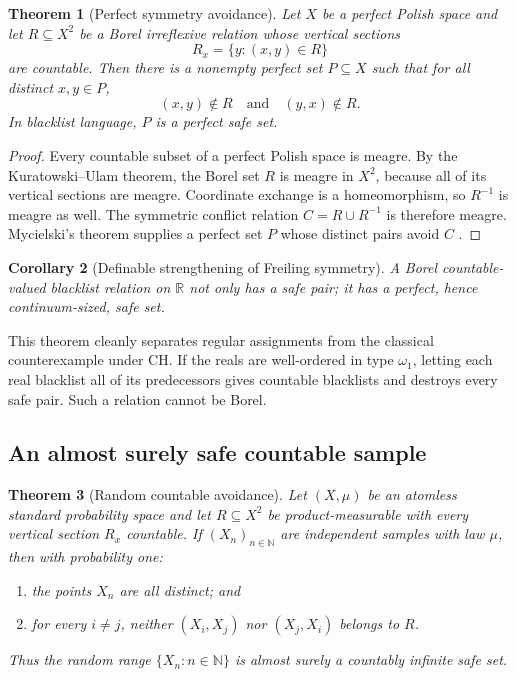 \documentclass[11pt]{article}
\newtheorem{theorem}{Theorem}[section]
\newtheorem{corollary}[theorem]{Corollary}
\theoremstyle{definition}
\theoremstyle{remark}
\newcommand{\N}{\mathbb N}
\newcommand{\R}{\mathbb R}
\begin{document}
\begin{theorem}[Perfect symmetry avoidance]\label{fbl:thm:perfect}
Let $X$ be a perfect Polish space and let $R\subseteq X^2$ be a Borel
irreflexive relation whose vertical sections
\[
       R_x=\{y:(x,y)\in R\}
\]
are countable.  Then there is a nonempty perfect set $P\subseteq X$ such
that for all distinct $x,y\in P$,
\[
        (x,y)\notin R
        \quad\text{and}\quad
        (y,x)\notin R.
\]
In blacklist language, $P$ is a perfect safe set.
\end{theorem}

\begin{proof}
Every countable subset of a perfect Polish space is meagre.  By the
Kuratowski--Ulam theorem, the Borel set $R$ is meagre in $X^2$, because all
of its vertical sections are meagre.  Coordinate exchange is a homeomorphism,
so $R^{-1}$ is meagre as well.  The symmetric conflict relation
$C=R\cup R^{-1}$ is therefore meagre.  Mycielski's theorem supplies a
perfect set $P$ whose distinct pairs avoid $C$ \cite{Mycielski,Kechris}.
\end{proof}

\begin{corollary}[Definable strengthening of Freiling symmetry]\label{fbl:cor:freiling}
A Borel countable-valued blacklist relation on $\R$ not only has a safe
pair; it has a perfect, hence continuum-sized, safe set.
\end{corollary}

This theorem cleanly separates regular assignments from the classical
counterexample under CH.  If the reals are well-ordered in type $\omega_1$,
letting each real blacklist all of its predecessors gives countable
blacklists and destroys every safe pair.  Such a relation cannot be Borel.

\subsection{An almost surely safe countable sample}

\begin{theorem}[Random countable avoidance]\label{fbl:thm:random}
Let $(X,\mu)$ be an atomless standard probability space and let
$R\subseteq X^2$ be product-measurable with every vertical section $R_x$
countable.  If $(X_n)_{n\in\N}$ are independent samples with law $\mu$, then
with probability one:
\begin{enumerate}[label=(\roman*)]
\item the points $X_n$ are all distinct; and
\item for every $i\ne j$, neither $(X_i,X_j)$ nor $(X_j,X_i)$ belongs to
$R$.
\end{enumerate}
Thus the random range $\{X_n:n\in\N\}$ is almost surely a countably infinite
safe set.
\end{theorem}
\end{document}
